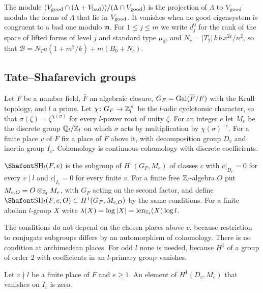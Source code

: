 The module $(V_{\rm good}\cap(\Lambda+V_{\rm bad}))/(\Lambda\cap V_{\rm good})$ is the projection of $\Lambda$ to $V_{\rm good}$ modulo the forms of $\Lambda$ that lie in $V_{\rm good}$. It vanishes when no good eigensystem is congruent to a bad one modulo $\mathfrak m$. For $1\le j\le m$ we write $d^0_j$ for the rank of the space of lifted forms of level $j$ and standard type $\mu_0$, and $N_c=\lvert T_2\rvert\,k\,b\,x^{2\varepsilon}/n^2$, so that $\mathcal B=N_Ta(1+m^2/k)+m(B_0+N_c)$.

\subsection{Tate--Shafarevich groups}\label{tw:sec:sha}

Let $F$ be a number field, $\overline F$ an algebraic closure, $G_F=\operatorname{Gal}(\overline F/F)$ with the Krull topology, and $l$ a prime. Let $\chi\colon G_F\to\mathbb Z_l^\times$ be the $l$-adic cyclotomic character, so that $\sigma(\zeta)=\zeta^{\chi(\sigma)}$ for every $l$-power root of unity $\zeta$. For an integer $e$ let $M_e$ be the discrete group $\mathbb Q_l/\mathbb Z_l$ on which $\sigma$ acts by multiplication by $\chi(\sigma)^{-e}$. For a finite place $v$ of $F$ fix a place of $\overline F$ above it, with decomposition group $D_v$ and inertia group $I_v$. Cohomology is continuous cohomology with discrete coefficients.

\begin{definition}\label{w4:def:sha}
$\Sha_l(F,e)$ is the subgroup of $H^1(G_F,M_e)$ of classes $c$ with $c|_{D_v}=0$ for every $v\mid l$ and $c|_{I_v}=0$ for every finite $v$. For a finite free $\mathbb Z_l$-algebra $O$ put $M_{e,O}=O\otimes_{\mathbb Z_l}M_e$, with $G_F$ acting on the second factor, and define $\Sha_l(F,e;O)\subset H^1(G_F,M_{e,O})$ by the same conditions. For a finite abelian $l$-group $X$ write $\lambda(X)=\log|X|=\operatorname{len}_{\mathbb Z_l}(X)\log l$.
\end{definition}

The conditions do not depend on the chosen places above $v$, because restriction to conjugate subgroups differs by an automorphism of cohomology. There is no condition at archimedean places. For odd $l$ none is needed, because $H^1$ of a group of order $2$ with coefficients in an $l$-primary group vanishes.

\begin{lemma}\label{w4:lem:unram}
Let $v\nmid l$ be a finite place of $F$ and $e\ge1$. An element of $H^1(D_v,M_e)$ that vanishes on $I_v$ is zero.
\end{lemma}

